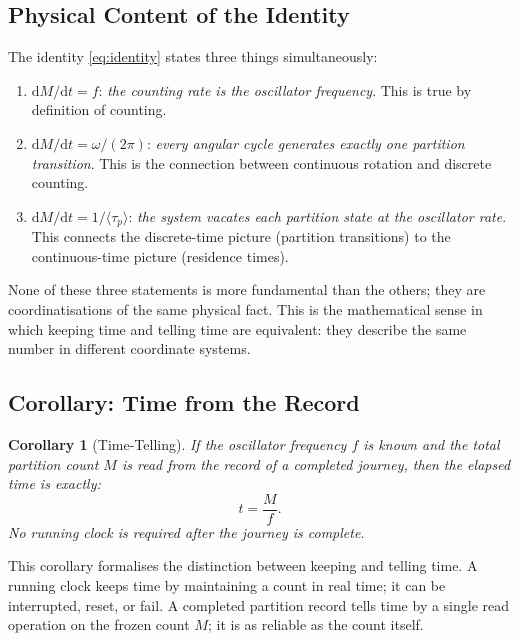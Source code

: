 \documentclass[twocolumn,10pt]{article}
\newtheorem{corollary}[theorem]{Corollary}
\newcommand{\tp}{\langle\tau_p\rangle}
\newcommand{\dM}{\mathrm{d}M}
\newcommand{\dt}{\mathrm{d}t}
\begin{document}
\subsection{Physical Content of the Identity}

The identity \eqref{eq:identity} states three things simultaneously:

\begin{enumerate}
    \item $\dM/\dt = f$: \textit{the counting rate is the oscillator frequency}. This is true by definition of counting.

    \item $\dM/\dt = \omega/(2\pi)$: \textit{every angular cycle generates exactly one partition transition}. This is the connection between continuous rotation and discrete counting.

    \item $\dM/\dt = 1/\tp$: \textit{the system vacates each partition state at the oscillator rate}. This connects the discrete-time picture (partition transitions) to the continuous-time picture (residence times).
\end{enumerate}

None of these three statements is more fundamental than the others; they are coordinatisations of the same physical fact. This is the mathematical sense in which keeping time and telling time are equivalent: they describe the same number in different coordinate systems.

\subsection{Corollary: Time from the Record}

\begin{corollary}[Time-Telling]
\label{cor:timetelling}
If the oscillator frequency $f$ is known and the total partition count $M$ is read from the record of a completed journey, then the elapsed time is exactly:
\begin{equation}
    t = \frac{M}{f}.
    \label{eq:timetelling}
\end{equation}
No running clock is required after the journey is complete.
\end{corollary}

This corollary formalises the distinction between keeping and telling time. A running clock keeps time by maintaining a count in real time; it can be interrupted, reset, or fail. A completed partition record tells time by a single read operation on the frozen count $M$; it is as reliable as the count itself.
\end{document}
